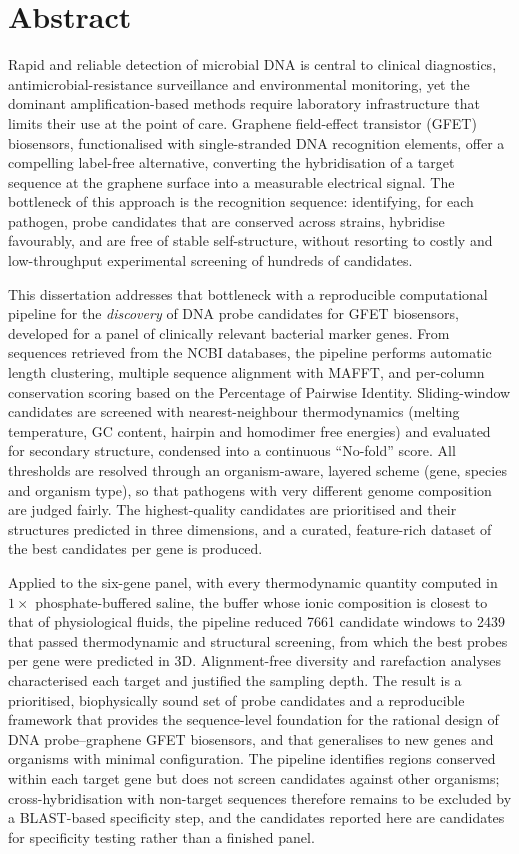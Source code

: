 \chapter*{Abstract}

Rapid and reliable detection of microbial DNA is central to clinical diagnostics, antimicrobial-resistance
surveillance and environmental monitoring, yet the dominant amplification-based methods require
laboratory infrastructure that limits their use at the point of care. Graphene field-effect transistor
(GFET) biosensors, functionalised with single-stranded DNA recognition elements, offer a compelling
label-free alternative, converting the hybridisation of a target sequence at the graphene surface into a
measurable electrical signal. The bottleneck of this approach is the recognition sequence: identifying, for
each pathogen, probe candidates that are conserved across strains, hybridise favourably, and are free of
stable self-structure, without resorting to costly and low-throughput experimental screening of hundreds
of candidates.

This dissertation addresses that bottleneck with a reproducible computational pipeline for the
\emph{discovery} of DNA probe candidates for GFET biosensors, developed for a panel of clinically
relevant bacterial marker genes. From sequences retrieved from the NCBI databases, the pipeline
performs automatic length clustering, multiple sequence alignment with MAFFT, and per-column
conservation scoring based on the Percentage of Pairwise Identity. Sliding-window candidates are
screened with nearest-neighbour thermodynamics (melting temperature, GC content, hairpin and
homodimer free energies) and evaluated for secondary structure, condensed into a continuous ``No-fold''
score. All thresholds are resolved through an organism-aware, layered scheme (gene, species and
organism type), so that pathogens with very different genome composition are judged fairly. The
highest-quality candidates are prioritised and their structures predicted in three dimensions, and a
curated, feature-rich dataset of the best candidates per gene is produced.

Applied to the six-gene panel, with every thermodynamic quantity computed in $1\times$
phosphate-buffered saline, the buffer whose ionic composition is closest to that of physiological fluids,
the pipeline reduced 7661 candidate windows to 2439 that passed thermodynamic and structural
screening, from which the best probes per gene were predicted in 3D.
Alignment-free diversity and rarefaction analyses characterised each target and
justified the sampling depth. The result is a prioritised, biophysically sound set of probe candidates and a
reproducible framework that provides the sequence-level foundation for the rational design of
DNA probe--graphene GFET biosensors, and that generalises to new genes and organisms with minimal
configuration. The pipeline identifies regions conserved within each target gene but does not
screen candidates against other organisms; cross-hybridisation with non-target sequences therefore
remains to be excluded by a BLAST-based specificity step, and the candidates reported here are
candidates for specificity testing rather than a finished panel.

